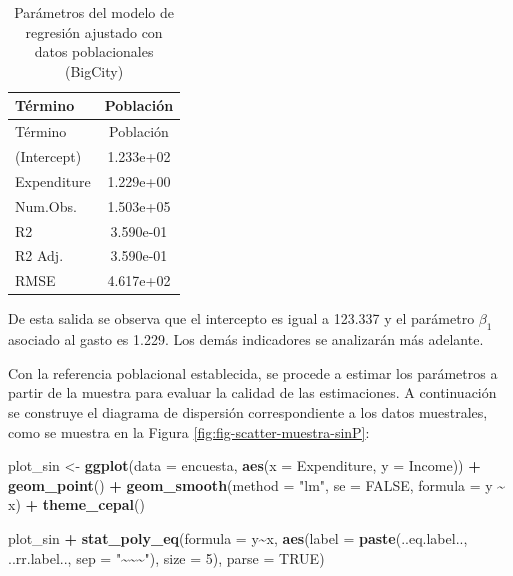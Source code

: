 \documentclass[
  spanish,
  12pt,
]{book}
\newenvironment{Shaded}{\begin{snugshade}}{\end{snugshade}}
\newcommand{\AttributeTok}[1]{\textcolor[rgb]{0.13,0.29,0.53}{#1}}
\newcommand{\ConstantTok}[1]{\textcolor[rgb]{0.56,0.35,0.01}{#1}}
\newcommand{\DecValTok}[1]{\textcolor[rgb]{0.00,0.00,0.81}{#1}}
\newcommand{\FunctionTok}[1]{\textcolor[rgb]{0.13,0.29,0.53}{\textbf{#1}}}
\newcommand{\NormalTok}[1]{#1}
\newcommand{\OtherTok}[1]{\textcolor[rgb]{0.56,0.35,0.01}{#1}}
\newcommand{\SpecialCharTok}[1]{\textcolor[rgb]{0.81,0.36,0.00}{\textbf{#1}}}
\newcommand{\StringTok}[1]{\textcolor[rgb]{0.31,0.60,0.02}{#1}}
\begin{document}
\begin{longtable}[]{@{}lc@{}}
\caption{\label{tab:tab-modelo-poblacional}Parámetros del modelo de regresión ajustado con datos poblacionales (BigCity)}\tabularnewline
\toprule\noalign{}
Término & Población \\
\midrule\noalign{}
\endfirsthead
\toprule\noalign{}
Término & Población \\
\midrule\noalign{}
\endhead
\bottomrule\noalign{}
\endlastfoot
(Intercept) & 1.233e+02 \\
Expenditure & 1.229e+00 \\
Num.Obs. & 1.503e+05 \\
R2 & 3.590e-01 \\
R2 Adj. & 3.590e-01 \\
RMSE & 4.617e+02 \\
\end{longtable}

De esta salida se observa que el intercepto es igual a 123.337 y el parámetro \(\beta_{1}\) asociado al gasto es 1.229. Los demás indicadores se analizarán más adelante.

Con la referencia poblacional establecida, se procede a estimar los parámetros a partir de la muestra para evaluar la calidad de las estimaciones. A continuación se construye el diagrama de dispersión correspondiente a los datos muestrales, como se muestra en la Figura \ref{fig:fig-scatter-muestra-sinP}:

\begin{Shaded}
\begin{Highlighting}[]
\NormalTok{plot\_sin }\OtherTok{\textless{}{-}} \FunctionTok{ggplot}\NormalTok{(}\AttributeTok{data =}\NormalTok{ encuesta,}
            \FunctionTok{aes}\NormalTok{(}\AttributeTok{x =}\NormalTok{ Expenditure, }\AttributeTok{y =}\NormalTok{ Income)) }\SpecialCharTok{+}
            \FunctionTok{geom\_point}\NormalTok{() }\SpecialCharTok{+}
            \FunctionTok{geom\_smooth}\NormalTok{(}\AttributeTok{method =} \StringTok{"lm"}\NormalTok{,}
            \AttributeTok{se =} \ConstantTok{FALSE}\NormalTok{, }\AttributeTok{formula =}\NormalTok{ y }\SpecialCharTok{\textasciitilde{}}\NormalTok{ x) }\SpecialCharTok{+} \FunctionTok{theme\_cepal}\NormalTok{()}

\NormalTok{plot\_sin }\SpecialCharTok{+} \FunctionTok{stat\_poly\_eq}\NormalTok{(}\AttributeTok{formula =}\NormalTok{ y}\SpecialCharTok{\textasciitilde{}}\NormalTok{x, }\FunctionTok{aes}\NormalTok{(}\AttributeTok{label =} \FunctionTok{paste}\NormalTok{(..eq.label..,}
\NormalTok{     ..rr.label.., }\AttributeTok{sep =} \StringTok{"\textasciitilde{}\textasciitilde{}\textasciitilde{}"}\NormalTok{), }\AttributeTok{size =} \DecValTok{5}\NormalTok{), }\AttributeTok{parse =} \ConstantTok{TRUE}\NormalTok{)}
\end{Highlighting}
\end{Shaded}
\end{document}
